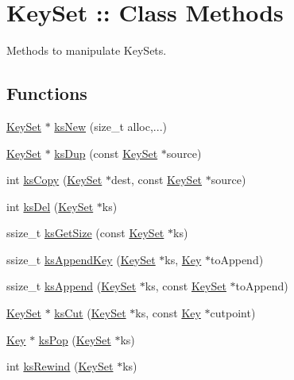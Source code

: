 \hypertarget{group__keyset}{
\section{KeySet :: Class Methods}
\label{group__keyset}
}


Methods to manipulate KeySets.  


\subsection*{Functions}
\begin{DoxyCompactItemize}
\item 
\hyperlink{struct__KeySet}{KeySet} $\ast$ \hyperlink{group__keyset_ga671e1aaee3ae9dc13b4834a4ddbd2c3c}{ksNew} (size\_\-t alloc,...)
\item 
\hyperlink{struct__KeySet}{KeySet} $\ast$ \hyperlink{group__keyset_gac59e4b328245463f1451f68d5106151c}{ksDup} (const \hyperlink{struct__KeySet}{KeySet} $\ast$source)
\item 
int \hyperlink{group__keyset_gaba1f1dbea191f4d7e7eb3e4296ae7d5e}{ksCopy} (\hyperlink{struct__KeySet}{KeySet} $\ast$dest, const \hyperlink{struct__KeySet}{KeySet} $\ast$source)
\item 
int \hyperlink{group__keyset_ga27e5c16473b02a422238c8d970db7ac8}{ksDel} (\hyperlink{struct__KeySet}{KeySet} $\ast$ks)
\item 
ssize\_\-t \hyperlink{group__keyset_ga7474ad6b0a0fa969dbdf267ba5770eee}{ksGetSize} (const \hyperlink{struct__KeySet}{KeySet} $\ast$ks)
\item 
ssize\_\-t \hyperlink{group__keyset_gaa5a1d467a4d71041edce68ea7748ce45}{ksAppendKey} (\hyperlink{struct__KeySet}{KeySet} $\ast$ks, \hyperlink{struct__Key}{Key} $\ast$toAppend)
\item 
ssize\_\-t \hyperlink{group__keyset_ga21eb9c3a14a604ee3a8bdc779232e7b7}{ksAppend} (\hyperlink{struct__KeySet}{KeySet} $\ast$ks, const \hyperlink{struct__KeySet}{KeySet} $\ast$toAppend)
\item 
\hyperlink{struct__KeySet}{KeySet} $\ast$ \hyperlink{group__keyset_ga6b00cf82b59af4d883a9bad6cf4a4a4a}{ksCut} (\hyperlink{struct__KeySet}{KeySet} $\ast$ks, const \hyperlink{struct__Key}{Key} $\ast$cutpoint)
\item 
\hyperlink{struct__Key}{Key} $\ast$ \hyperlink{group__keyset_gae42530b04defb772059de0600159cf69}{ksPop} (\hyperlink{struct__KeySet}{KeySet} $\ast$ks)
\item 
int \hyperlink{group__keyset_gabe793ff51f1728e3429c84a8a9086b70}{ksRewind} (\hyperlink{struct__KeySet}{KeySet} $\ast$ks)

\end{DoxyCompactItemize}
